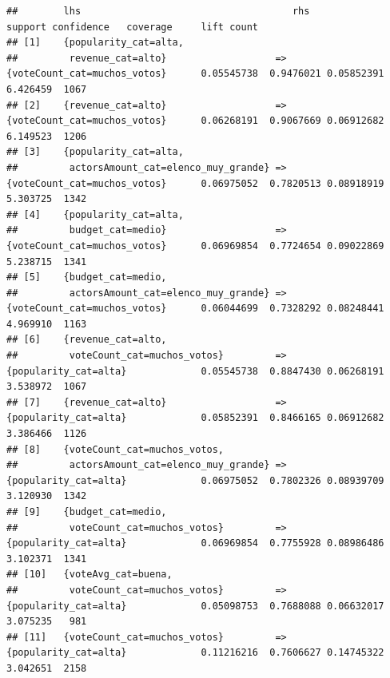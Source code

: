 \documentclass[
]{article}
\begin{document}
\begin{verbatim}
##        lhs                                     rhs                                  support confidence   coverage     lift count
## [1]    {popularity_cat=alta,                                                                                                    
##         revenue_cat=alto}                   => {voteCount_cat=muchos_votos}      0.05545738  0.9476021 0.05852391 6.426459  1067
## [2]    {revenue_cat=alto}                   => {voteCount_cat=muchos_votos}      0.06268191  0.9067669 0.06912682 6.149523  1206
## [3]    {popularity_cat=alta,                                                                                                    
##         actorsAmount_cat=elenco_muy_grande} => {voteCount_cat=muchos_votos}      0.06975052  0.7820513 0.08918919 5.303725  1342
## [4]    {popularity_cat=alta,                                                                                                    
##         budget_cat=medio}                   => {voteCount_cat=muchos_votos}      0.06969854  0.7724654 0.09022869 5.238715  1341
## [5]    {budget_cat=medio,                                                                                                       
##         actorsAmount_cat=elenco_muy_grande} => {voteCount_cat=muchos_votos}      0.06044699  0.7328292 0.08248441 4.969910  1163
## [6]    {revenue_cat=alto,                                                                                                       
##         voteCount_cat=muchos_votos}         => {popularity_cat=alta}             0.05545738  0.8847430 0.06268191 3.538972  1067
## [7]    {revenue_cat=alto}                   => {popularity_cat=alta}             0.05852391  0.8466165 0.06912682 3.386466  1126
## [8]    {voteCount_cat=muchos_votos,                                                                                             
##         actorsAmount_cat=elenco_muy_grande} => {popularity_cat=alta}             0.06975052  0.7802326 0.08939709 3.120930  1342
## [9]    {budget_cat=medio,                                                                                                       
##         voteCount_cat=muchos_votos}         => {popularity_cat=alta}             0.06969854  0.7755928 0.08986486 3.102371  1341
## [10]   {voteAvg_cat=buena,                                                                                                      
##         voteCount_cat=muchos_votos}         => {popularity_cat=alta}             0.05098753  0.7688088 0.06632017 3.075235   981
## [11]   {voteCount_cat=muchos_votos}         => {popularity_cat=alta}             0.11216216  0.7606627 0.14745322 3.042651  2158

\end{verbatim}
\end{document}
